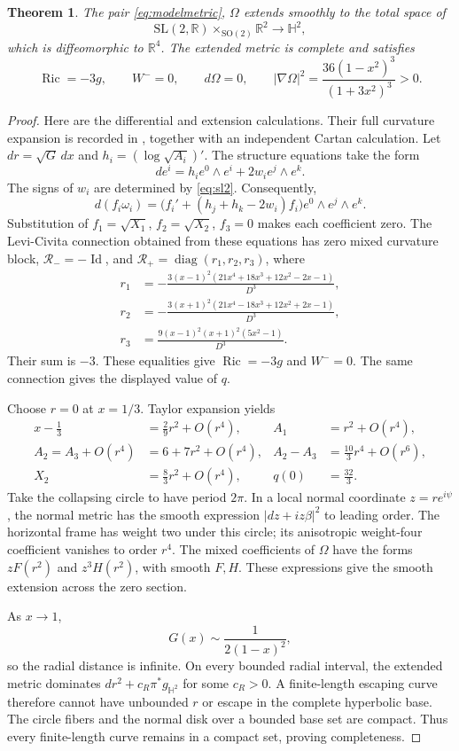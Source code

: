 \documentclass[11pt,a4paper]{article}
\newtheorem{theorem}{Theorem}[section]
\theoremstyle{definition}
\theoremstyle{remark}
\newcommand{\Ric}{\operatorname{Ric}}
\newcommand{\Id}{\operatorname{Id}}
\newcommand{\R}{\mathbb R}
\newcommand{\Hh}{\mathbb H}
\newcommand{\cR}{\mathcal R}
\begin{document}
\begin{theorem}\label{thm:complete}
The pair \eqref{eq:modelmetric}, $\Omega$ extends smoothly to the total space of
\[
 \mathrm{SL}(2,\R)\times_{\mathrm{SO}(2)}\R^2\longrightarrow\Hh^2,
\]
which is diffeomorphic to $\R^4$. The extended metric is complete and satisfies
\[
 \Ric=-3g,\qquad W^-=0,\qquad d\Omega=0,\qquad
 |\nabla\Omega|^2=\frac{36(1-x^2)^3}{(1+3x^2)^3}>0.
\]
\end{theorem}
\begin{proof}
Here are the differential and extension calculations. Their full curvature expansion is recorded in \cite{CompleteSource}, together with an independent Cartan calculation.
Let $dr=\sqrt G\,dx$ and $h_i=(\log\sqrt{A_i})'$. The structure equations take the form
\[
 de^i=h_i e^0\wedge e^i+2w_i e^j\wedge e^k.
\]
The signs of $w_i$ are determined by \eqref{eq:sl2}. Consequently,
\[
 d(f_i\omega_i)=\bigl(f_i'+(h_j+h_k-2w_i)f_i\bigr)e^0\wedge e^j\wedge e^k.
\]
Substitution of $f_1=\sqrt{X_1}$, $f_2=\sqrt{X_2}$, $f_3=0$ makes each coefficient zero. The Levi-Civita connection obtained from these equations has zero mixed curvature block, $\cR_-=-\Id$, and $\cR_+=\operatorname{diag}(r_1,r_2,r_3)$, where
\begin{align*}
 r_1&=-\frac{3(x-1)^2(21x^4+18x^3+12x^2-2x-1)}{D^3},\\
 r_2&=-\frac{3(x+1)^2(21x^4-18x^3+12x^2+2x-1)}{D^3},\\
 r_3&=\frac{9(x-1)^2(x+1)^2(5x^2-1)}{D^3}.
\end{align*}
Their sum is $-3$. These equalities give $\Ric=-3g$ and $W^-=0$. The same connection gives the displayed value of $q$.

Choose $r=0$ at $x=1/3$. Taylor expansion yields
\begin{align*}
 x-\tfrac13&=\tfrac29r^2+O(r^4),& A_1&=r^2+O(r^4),\\
 A_2=A_3+O(r^4)&=6+7r^2+O(r^4),& A_2-A_3&=\tfrac{10}{3}r^4+O(r^6),\\
 X_2&=\tfrac83r^2+O(r^4),& q(0)&=\tfrac{32}{3}.
\end{align*}
Take the collapsing circle to have period $2\pi$. In a local normal coordinate $z=re^{i\psi}$, the normal metric has the smooth expression $|dz+iz\beta|^2$ to leading order. The horizontal frame has weight two under this circle; its anisotropic weight-four coefficient vanishes to order $r^4$. The mixed coefficients of $\Omega$ have the forms $zF(r^2)$ and $z^3H(r^2)$, with smooth $F,H$. These expressions give the smooth extension across the zero section.

As $x\to1$,
\[
 G(x)\sim\frac1{2(1-x)^2},
\]
so the radial distance is infinite. On every bounded radial interval, the extended metric dominates $dr^2+c_R\pi^*g_{\Hh^2}$ for some $c_R>0$. A finite-length escaping curve therefore cannot have unbounded $r$ or escape in the complete hyperbolic base. The circle fibers and the normal disk over a bounded base set are compact. Thus every finite-length curve remains in a compact set, proving completeness.
\end{proof}
\end{document}
